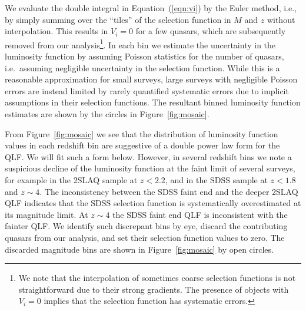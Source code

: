 \documentclass[fleqn,usenatbib]{mnras}
\begin{document}
We evaluate the double integral in Equation~(\ref{eqn:vi}) by the Euler method,
i.e., by simply summing over the ``tiles'' of the selection function in $M$ and $z$
without interpolation.
This results in $V_i=0$ for a few quasars, which are subsequently removed
from our analysis\footnote{
  We note that the interpolation of sometimes coarse
  selection functions is not straightforward due to their strong gradients.
  The presence of objects with $V_i=0$ implies that the selection function has systematic errors.}.
In each bin we estimate the uncertainty in the luminosity function by
assuming Poisson statistics \citep{1986ApJ...303..336G} for the number
of quasars, i.e.\ assuming negligible uncertainty in the selection function.
While this is a reasonable approximation for small surveys, large surveys
with negligible Poisson errors are instead limited by rarely quantified systematic
errors due to implicit assumptions in their selection functions.
The resultant binned luminosity function estimates
are shown by the circles in Figure~\ref{fig:mosaic}.

From Figure~\ref{fig:mosaic} we see that the distribution of
luminosity function values in each redshift bin are suggestive of a
double power law form for the QLF.  We will fit such a form below.
However, in several redshift bins we note a suspicious decline of the
luminosity function at the faint limit of several surveys, for example
in the 2SLAQ sample at $z<2.2$, and in the SDSS sample at $z<1.8$ and
$z\sim 4$.  The inconsistency between the SDSS faint end and the
deeper 2SLAQ QLF indicates that the SDSS selection function is
systematically overestimated at its magnitude limit.  At $z\sim 4$ the
SDSS faint end QLF is inconsistent with the fainter
\citet{2011ApJ...728L..26G} QLF. We identify such discrepant bins by
eye, discard the contributing quasars from our analysis, and set their
selection function values to zero.  The discarded magnitude bins are
shown in Figure~\ref{fig:mosaic} by open circles.
\end{document}
